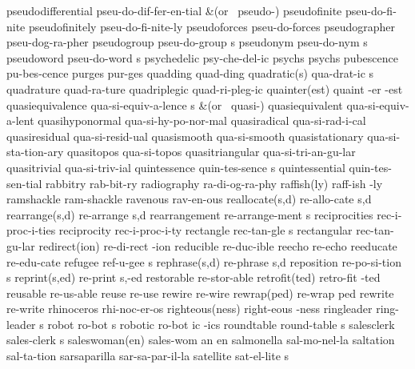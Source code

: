 \1 pseudodifferential	pseu-do-dif-fer-en-tial
\tabalign {}		&\null\quad (or \ pseudo-{}) \cr
\1 pseudofinite 	pseu-do-fi-nite
\1 pseudofinitely	pseu-do-fi-nite-ly
\1 pseudoforces 	pseu-do-forces
\1 pseudographer	pseu-dog-ra-pher	%
\5 pseudogroup		pseu-do-group s		%
\5 pseudonym		pseu-do-nym s
\5 pseudoword		pseu-do-word s
\1 psychedelic		psy-che-del-ic
\1 psychs		psychs
\1 pubescence		pu-bes-cence
\NewWordtrue
\1 purges		pur-ges			%
\1 quadding		quad-ding
\2 quadratic(s)		qua-drat-ic s
\1 quadrature		quad-ra-ture
\1 quadriplegic		quad-ri-pleg-ic
\3 quainter(est)	quaint -er -est
\5 quasiequivalence	qua-si-equiv-a-lence s
\tabalign {}		&\null\quad (or \ quasi-{}) \cr
\1 quasiequivalent	qua-si-equiv-a-lent	%
\1 quasihyponormal	qua-si-hy-po-nor-mal
\1 quasiradical 	qua-si-rad-i-cal
\1 quasiresidual	qua-si-resid-ual
\1 quasismooth		qua-si-smooth
\1 quasistationary	qua-si-sta-tion-ary
\1 quasitopos		qua-si-topos
\1 quasitriangular	qua-si-tri-an-gu-lar
\1 quasitrivial		qua-si-triv-ial		%
\5 quintessence		quin-tes-sence s
\1 quintessential	quin-tes-sen-tial
\1 rabbitry		rab-bit-ry
\1 radiography		ra-di-og-ra-phy
\2 raffish(ly)		raff-ish -ly
\1 ramshackle		ram-shackle
\1 ravenous		rav-en-ous
\2 reallocate(s,d)	re-allo-cate s,d	%
\2 rearrange(s,d)	re-arrange s,d		%
\5 rearrangement	re-arrange-ment s
\1 reciprocities	rec-i-proc-i-ties
\1 reciprocity		rec-i-proc-i-ty
\5 rectangle		rec-tan-gle s
\1 rectangular		rec-tan-gu-lar
\2 redirect(ion)	re-di-rect -ion		%
\1 reducible            re-duc-ible	%
\1 reecho		re-echo
\NewWordtrue
\1 reeducate		re-edu-cate		%
\NewWordtrue
\5 refugee		ref-u-gee s		%
\2 rephrase(s,d)	re-phrase s,d		%
\5 reposition		re-po-si-tion s		%
\2 reprint(s,ed)	re-print s,-ed
\1 restorable		re-stor-able
\2 retrofit(ted)	retro-fit -ted
\1 reusable		re-us-able		%
\1 reuse		re-use			%
\1 rewire		re-wire 		%
\2 rewrap(ped)		re-wrap ped		%
\1 rewrite		re-write		%
\1 rhinoceros		rhi-noc-er-os
\2 righteous(ness)	right-eous -ness
\5 ringleader		ring-leader s
\5 robot		ro-bot s
\6 robotic		ro-bot ic -ics
\5 roundtable		round-table s
\5 salesclerk		sales-clerk s
\3 saleswoman(en)	sales-wom an en
\1 salmonella		sal-mo-nel-la
\1 saltation		sal-ta-tion		%
\1 sarsaparilla		sar-sa-par-il-la
\NewWordtrue
\5 satellite		sat-el-lite s		%

